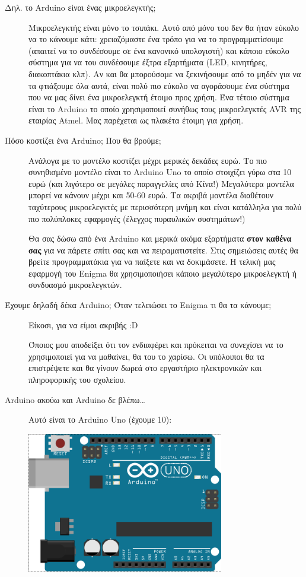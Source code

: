 \documentclass[a4paper,twoside,12pt]{article}
\begin{document}
\begin{description}
\item[Δηλ. το Arduino είναι ένας μικροελεγκτής;]
%
Μικροελεγκτής είναι μόνο το τσιπάκι. Αυτό από μόνο του δεν θα ήταν εύκολο να το κάνουμε κάτι: χρειαζόμαστε ένα τρόπο για να το προγραμματίσουμε (απαιτεί να το συνδέσουμε σε ένα κανονικό υπολογιστή) και κάποιο εύκολο σύστημα για να του συνδέσουμε έξτρα εξαρτήματα (LED, κινητήρες, διακοπτάκια κλπ). Αν και θα μπορούσαμε να ξεκινήσουμε από το μηδέν για να τα φτιάξουμε όλα αυτά, είναι πολύ πιο εύκολο να αγοράσουμε ένα σύστημα που να μας δίνει ένα μικροελεγκτή έτοιμο προς χρήση. Ένα τέτοιο σύστημα είναι το Arduino το οποίο χρησιμοποιεί συνήθως τους μικροελεγκτές AVR της εταιρίας Atmel. Μας παρέχεται ως πλακέτα έτοιμη για χρήση.

\item[Πόσο κοστίζει ένα Arduino; Που θα βρούμε;]
%
Ανάλογα με το μοντέλο κοστίζει μέχρι μερικές δεκάδες ευρώ. Το πιο συνηθισμένο μοντέλο είναι το Arduino Uno το οποίο στοιχίζει γύρω στα 10 ευρώ (και λιγότερο σε μεγάλες παραγγελίες από Κίνα!) Μεγαλύτερα μοντέλα μπορεί να κάνουν μέχρι και 50-60 ευρώ. Τα ακριβά μοντέλα διαθέτουν ταχύτερους μικροελεγκτές με περισσότερη μνήμη και είναι κατάλληλα για πολύ πιο πολύπλοκες εφαρμογές (έλεγχος πυραυλικών συστημάτων!)

Θα σας δώσω από ένα Arduino και μερικά ακόμα εξαρτήματα \textbf{στον καθένα σας} για να πάρετε σπίτι σας και να πειραματιστείτε. Στις σημειώσεις αυτές θα βρείτε προγραμματάκια για να παίξετε και να δοκιμάσετε. Η τελική μας εφαρμογή του Enigma θα χρησιμοποιήσει κάποιο μεγαλύτερο μικροελεγκτή ή συνδυασμό μικροελεγκτών.

\item[Έχουμε δηλαδή δέκα Arduino; Όταν τελειώσει το Enigma τι θα τα κάνουμε;]

Είκοσι, για να είμαι ακριβής :D
 
Όποιος μου αποδείξει ότι τον ενδιαφέρει και πρόκειται να συνεχίσει να το χρησιμοποιεί για να μαθαίνει, θα του το χαρίσω.  Οι υπόλοιποι θα τα επιστρέψετε και θα γίνουν δωρεά στο εργαστήριο ηλεκτρονικών και πληροφορικής του σχολείου.

\item[Arduino ακούω και Arduino δε βλέπω\ldots]

Αυτό είναι το Arduino Uno (έχουμε 10):

\begin{center}
  \includegraphics[width=0.7\textwidth]{images/main/uno}
\end{center}


\end{description}
\end{document}
